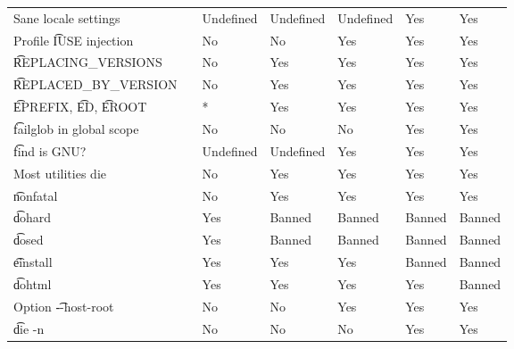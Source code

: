 \begin{landscape}
\begin{longtable}{llP{7.5em}P{7.5em}P{7.5em}P{7.5em}P{7.5em}}
Sane locale settings &  &
    Undefined & Undefined & Undefined & Yes & Yes \\

Profile \t{IUSE} injection &  &
    No & No & Yes & Yes & Yes \\

\t{REPLACING_VERSIONS} &  &
    No & Yes & Yes & Yes & Yes \\

\t{REPLACED_BY_VERSION} &  &
    No & Yes & Yes & Yes & Yes \\

\t{EPREFIX}, \t{ED}, \t{EROOT} &  &
    * & Yes & Yes & Yes & Yes \\

\t{failglob} in global scope &  &
    No & No & No & Yes & Yes \\

\t{find} is GNU? &  &
    Undefined & Undefined & Yes & Yes & Yes \\

Most utilities die &  &
    No & Yes & Yes & Yes & Yes \\

\t{nonfatal} &  &
    No & Yes & Yes & Yes & Yes \\

\t{dohard} &  &
    Yes & Banned & Banned & Banned & Banned \\

\t{dosed} &  &
    Yes & Banned & Banned & Banned & Banned \\

\t{einstall} &  &
    Yes & Yes & Yes & Banned & Banned \\

\t{dohtml} &  &
    Yes & Yes & Yes & Yes & Banned \\

Option \t{-{}-host-root} &  &
    No & No & Yes & Yes & Yes \\

\t{die -n} &  &
    No & No & No & Yes & Yes \\


\end{longtable}
\end{landscape}
